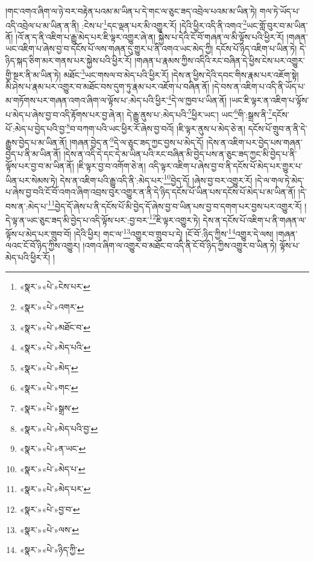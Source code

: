 །གང་འགའ་ཞིག་ལ་ཉེ་བར་བརྟེན་པའམ་མ་ཡིན་པ་དེ་གང་ལ་ཅུང་ཟད་འབྲེལ་པའམ་མ་ཡིན་ཏེ། གལ་ཏེ་ཡོད་པ་འདི་འབྲེལ་པ་མ་ཡིན་ན་ནི། :ངེས་པ་\footnote{«སྣར་»«པེ་»ངེས་པར་}དང་ལྡན་པར་མི་འགྱུར་རོ། །དེའི་ཕྱིར་འདི་ནི་འགའ་\footnote{«སྣར་»«པེ་»འགར་}ཡང་གློ་བུར་བ་མ་ཡིན་ནོ། །འོ་ན་ད་ནི་འཇིག་པ་རྒྱུ་མེད་པར་ཇི་ལྟར་འགྱུར་ཞེ་ན། སྐྱེས་པ་དེའི་ངོ་བོ་གཞན་ལ་མི་ལྟོས་པའི་ཕྱིར་རོ། །གཞན་ཡང་འཇིག་པ་ཞེས་བྱ་བ་དངོས་པོ་ལས་གཞན་དུ་གྱུར་པ་ནི་འགའ་ཡང་མེད་ཀྱི། དངོས་པོ་ཉིད་འཇིག་པ་ཡིན་ཏེ། དེ་ཉིད་སྐད་ཅིག་མར་གནས་པར་སྐྱེས་པའི་ཕྱིར་རོ། །གཞན་པ་རྣམས་ཀྱིས་འདིའི་རང་བཞིན་དེ་ཕྱིས་ངེས་པར་འགྱུར་གྱི་སྔར་ནི་མ་ཡིན་ཏེ། མཐོང་\footnote{«སྣར་»«པེ་»མཐོང་བ་}ཡང་གསལ་བ་མེད་པའི་ཕྱིར་རོ། །དེས་ན་ཕྱིས་དེའི་དབང་གིས་རྣམ་པར་འཇོག་སྟེ། མི་ཤེས་པ་རྣམ་པར་འགྱུར་བ་མཐོང་བས་དུག་ཏུ་རྣམ་པར་འཇོག་པ་བཞིན་ནོ། །དེ་བས་ན་འཇིག་པ་འདི་ནི་ཡོད་པ་མ་གཏོགས་པར་གཞན་འགའ་ཞིག་ལ་ལྟོས་པ་:མེད་པའི་ཕྱིར་\footnote{«སྣར་»«པེ་»མེད་པའི་}དེ་ལ་ཁྱབ་པ་ཡིན་ནོ། །ཡང་ཇི་ལྟར་ན་འཇིག་པ་ལྟོས་པ་མེད་པ་ཞེས་བྱ་བ་འདི་རྟོགས་པར་བྱ་ཞེ་ན། དེ་རྒྱུ་ནུས་པ་:མེད་པའི་\footnote{«སྣར་»«པེ་»མེད་}ཕྱིར་ཡང་། ཡང་\footnote{«སྣར་»«པེ་»གང་}གི་:སྒྲས་ནི་\footnote{«སྣར་»«པེ་»སྒྲས་}དངོས་པོ་:མེད་པ་བྱེད་པའི་བྱ་\footnote{«སྣར་»«པེ་»མེད་པའི་བྱ་}བ་བཀག་པའི་ཡང་ཕྱིར་རོ་ཞེས་བྱ་བའོ། །ཇི་ལྟར་ནུས་པ་མེད་ཅེ་ན། དངོས་པོ་གྲུབ་ན་ནི་དེ་རྒྱུས་བྱེད་པ་མ་ཡིན་ནོ། །གཞན་བྱེད་ན་\footnote{«སྣར་»«པེ་»ན་ཡང་}དེ་ལ་ཅུང་ཟད་ཀྱང་བྱས་པ་མེད་དོ། །དེས་ན་འཇིག་པར་བྱེད་པས་གཞན་བྱེད་པ་ནི་མ་ཡིན་ནོ། །དེས་ན་འདི་དེ་དང་དེ་མ་ཡིན་པའི་རང་བཞིན་མི་བྱེད་པས་ན་ཅུང་ཟད་ཀྱང་མི་བྱེད་པ་ནི་ལྟོས་པར་བྱ་བ་མ་ཡིན་ནོ། །ཇི་ལྟར་བྱ་བ་འགོག་ཅེ་ན། འདི་ལྟར་འཇིག་པ་ཞེས་བྱ་བ་ནི་དངོས་པོ་མེད་པར་གྱུར་པ་ཡིན་པར་སེམས་ཏེ། དེས་ན་འཇིག་པའི་རྒྱུ་འདི་ནི་:མེད་པར་\footnote{«སྣར་»«པེ་»མེད་པ་}བྱེད་དོ། །ཞེས་བྱ་བར་འགྱུར་རོ། །དེ་ལ་གལ་ཏེ་མེད་པ་ཞེས་བྱ་བའི་ངོ་བོ་འགའ་ཞིག་འབྲས་བུར་འགྱུར་ན་ནི་དེ་ཉིད་དངོས་པོ་ཡིན་པས་དངོས་པོ་མེད་པ་མ་ཡིན་ནོ། །དེ་བས་ན་:མེད་པ་\footnote{«སྣར་»«པེ་»མེད་པར་}བྱེད་དོ་ཞེས་པ་ནི་དངོས་པོ་མི་བྱེད་དོ་ཞེས་བྱ་བ་ཡིན་པས་བྱ་བ་དགག་པར་བྱས་པར་འགྱུར་རོ། །དེ་ལྟ་ན་ཡང་ཅུང་ཟད་མི་བྱེད་པ་འདི་ལྟོས་པར་:བྱ་བར་\footnote{«སྣར་»«པེ་»བྱ་བ་}ཇི་ལྟར་འགྱུར་ཏེ། དེས་ན་དངོས་པོ་འཇིག་པ་ནི་གཞན་ལ་ལྟོས་པ་མེད་པར་གྲུབ་བོ། །དེའི་ཕྱིར། གང་ལ་\footnote{«སྣར་»«པེ་»ལས་}འགྱུར་བ་གྲུབ་པ་དེ། །ངོ་བོ་:ཉིད་ཀྱིས་\footnote{«སྣར་»«པེ་»ཉིད་ཀྱི་}འགྱུར་དེ་ལས། །གཞན་ལའང་ངོ་བོ་ཉིད་ཀྱིས་འགྱུར། །འགའ་ཞིག་ལ་འགྱུར་བ་མཐོང་བ་འདི་ནི་ངོ་བོ་ཉིད་ཀྱིས་འགྱུར་བ་ཡིན་ཏེ། ལྟོས་པ་མེད་པའི་ཕྱིར་རོ། །
